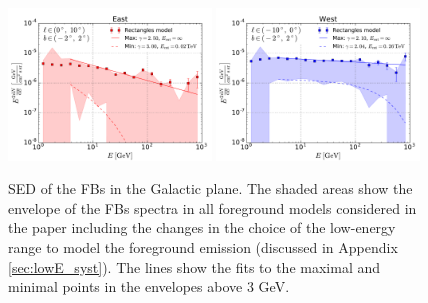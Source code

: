 
\begin{figure}[h]
\centering
 \includegraphics[width=0.48\textwidth]{plots/Summary_SED_b=0_l=5_old.pdf}
  \includegraphics[width=0.48\textwidth]{plots/Summary_SED_b=0_l=-5_old.pdf}
 \caption{SED of the FBs in the Galactic plane. 
 The shaded areas show the envelope of the FBs spectra in all foreground models considered in the paper
including the changes in the choice of the low-energy range to model the foreground emission
(discussed in Appendix \ref{sec:lowE_syst}).
The lines show the fits to the maximal and minimal points in the envelopes above 3 GeV.
}
 \label{fig:spec_summary}
\end{figure}



